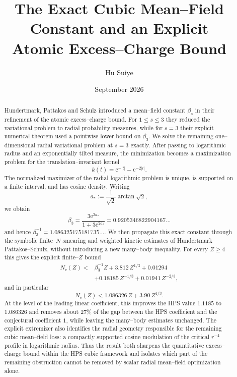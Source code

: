 \documentclass[11pt]{article}
\title{The Exact Cubic Mean--Field Constant and an Explicit\\Atomic Excess--Charge Bound}
\author{Hu Suiye}
\date{September 2026}
\numberwithin{equation}{section}
\theoremstyle{definition}
\newcommand{\ee}{\mathrm{e}}
\begin{document}
\maketitle

\begin{abstract}
Hundertmark, Pattakos and Schulz introduced a mean--field constant $\beta_s$ in their refinement of the atomic excess--charge bound.  For $1\le s\le 3$ they reduced the variational problem to radial probability measures, while for $s=3$ their explicit numerical theorem used a pointwise lower bound on $\beta_3$.  We solve the remaining one--dimensional radial variational problem at $s=3$ exactly.  After passing to logarithmic radius and an exponentially tilted measure, the minimization becomes a maximization problem for the translation--invariant kernel
\[
 k(t)=\ee^{-|t|}-\ee^{-2|t|}.
\]
The normalized maximizer of the radial logarithmic problem is unique, is supported on a finite interval, and has cosine density.  Writing
\[
 a_*:=\frac{1}{\sqrt2}\arctan\sqrt2,
\]
we obtain
\[
 \boxed{\displaystyle
 \beta_3=\frac{3\ee^{2a_*}}{1+3\ee^{2a_*}}
 =0.9205346822904167\ldots}
\]
and hence $\beta_3^{-1}=1.086325175181735\ldots$.  We then propagate this exact constant through the symbolic finite--$N$ smearing and weighted kinetic estimates of Hundertmark--Pattakos--Schulz, without introducing a new many--body inequality.  For every $Z\ge4$ this gives the explicit finite--$Z$ bound
\[
\begin{split}
N_c(Z)<{}&\beta_3^{-1}Z+3.812\,Z^{1/3}+0.01294\\
&+0.18185\,Z^{-1/3}+0.01941\,Z^{-2/3},
\end{split}
\]
and in particular
\[
 N_c(Z)<1.086326\,Z+3.90\,Z^{1/3}.
\]
At the level of the leading linear coefficient, this improves the HPS value $1.1185$ to $1.086326$ and removes about $27\%$ of the gap between the HPS coefficient and the conjectural coefficient $1$, while leaving the many--body estimates unchanged.  The explicit extremizer also identifies the radial geometry responsible for the remaining cubic mean--field loss: a compactly supported cosine modulation of the critical $r^{-4}$ profile in logarithmic radius.  Thus the result both sharpens the quantitative excess--charge bound within the HPS cubic framework and isolates which part of the remaining obstruction cannot be removed by scalar radial mean--field optimization alone.
\end{abstract}








\appendix




\end{document}
